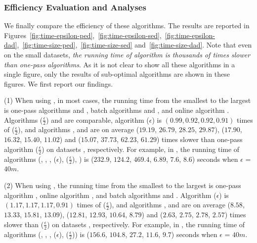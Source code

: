 \subsubsection{Efficiency Evaluation and Analyses}

We finally compare the efficiency of these algorithms.
The results are reported in Figures~\ref{fig:time-epsilon-ped},~\ref{fig:time-epsilon-sed},~\ref{fig:time-epsilon-dad},~\ref{fig:time-size-ped},~\ref{fig:time-size-sed} and~\ref{fig:time-size-dad}.
Note that even on the small datasets, \emph{the running time of algorithm \opt  is thousands of times slower than one-pass algorithms}. As it is not clear to show all these algorithms in a single figure, only the results of sub-optimal algorithms are shown in these figures.
We first report our findings.


\sstab (1) When using \ped, in most cases, the running time from the smallest to the largest is one-pass algorithms \siped and \operb, batch algorithms \tpa and \dpa, and online algorithm \bqsa.
Algorithms \siped($\frac{\epsilon}{2}$) and \operb are comparable, algorithm \siped(${\epsilon}$) is $(0.99, 0.92, 0.92, 0.91)$ times of \siped($\frac{\epsilon}{2}$), and algorithms \tpa, \dpa and \bqsa are on average
($19.19$, $26.79$, $28.25$, $29.87$), ($17.90$, $16.32$, $15.40$, $11.02$) and ($15.07$, $37.73$, $62.23$, $61.29$)
times slower than one-pass algorithm \siped($\frac{\epsilon}{2}$) on datasets \dSets, respectively.
%
For example, in \mopsi, the running time of algorithms
(\tpa, \dpa, \bqsa, \siped(${\epsilon}$), \siped($\frac{\epsilon}{2}$), \operb ) is ($232.9$, $124.2$, $469.4$, $6.89$, $7.6$, $8.6$) seconds when $\epsilon$ = $40m$.

\sstab (2) When using \sed, the running time from the smallest to the largest is one-pass algorithm \cised, online algorithm \squishe, and batch algorithms \tpa and \dpa. Algorithm \cised(${\epsilon}$) is $(1.17, 1.17, 1.17, 0.91)$ times of \cised($\frac{\epsilon}{2}$), and algorithms \tpa, \dpa and \squishe are on average
($8.58$, $13.33$, $15.81$, $13.09$), ($12.81$, $12.93$, $10.64$, $8.79$) and
($2.63$, $2.75$, $2.78$, $2.57$) times slower than \cised($\frac{\epsilon}{2}$) on datasets \dSets, respectively.
%
For example, in \mopsi, the running time of algorithms
(\tpa, \dpa, \squishe, \cised($\epsilon$), \cised($\frac{\epsilon}{2}$)) is ($156.6$, $104.8$, $27.2$, $11.6$, $9.7$) seconds when $\epsilon$ = $40m$.

